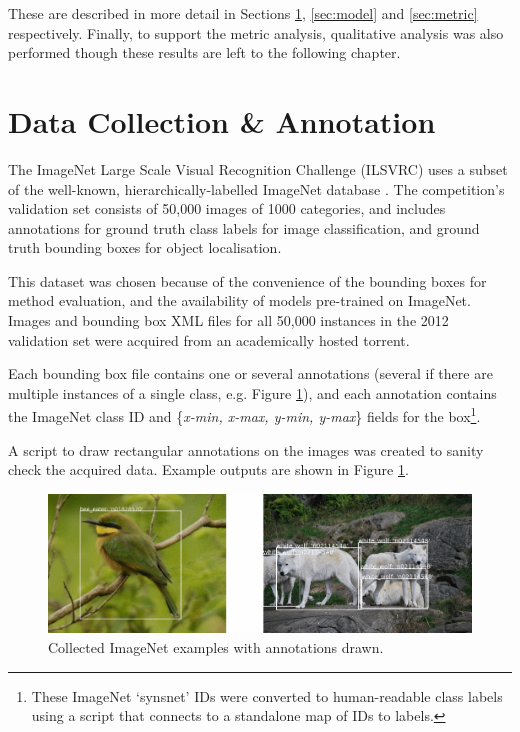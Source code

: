 \documentclass[main]{subfiles}
\begin{document}
These are described in more detail in Sections \ref{sec:data}, \ref{sec:model} and \ref{sec:metric} respectively. Finally, to support the metric analysis, qualitative analysis was also performed though these results are left to the following chapter.


\section{Data Collection \& Annotation} \label{sec:data}

The ImageNet Large Scale Visual Recognition Challenge (ILSVRC) uses a subset of the well-known, hierarchically-labelled ImageNet database \cite{ilsvrc}. The competition's validation set consists of 50,000 images of 1000 categories, and includes annotations for ground truth class labels for image classification, and ground truth bounding boxes for object localisation.

This dataset was chosen because of the convenience of the bounding boxes for method evaluation, and the availability of models pre-trained on ImageNet. Images and bounding box XML files for all 50,000 instances in the 2012 validation set were acquired from an academically hosted torrent.

Each bounding box file contains one or several annotations (several if there are multiple instances of a single class, e.g. Figure \ref{dataimg}), and each annotation contains the ImageNet class ID and \{\textit{x-min, x-max, y-min, y-max}\} fields for the box\footnote{These ImageNet `synsnet' IDs were converted to human-readable class labels using a script that connects to a standalone map of IDs to labels.}.

A script to draw rectangular annotations on the images was created to sanity check the acquired data. Example outputs are shown in Figure \ref{dataimg}.

\begin{figure}[h]
\centering
\includegraphics[scale=0.45]{annotation.png}
\caption{Collected ImageNet examples with annotations drawn.}
\label{dataimg}
\end{figure}
\end{document}
